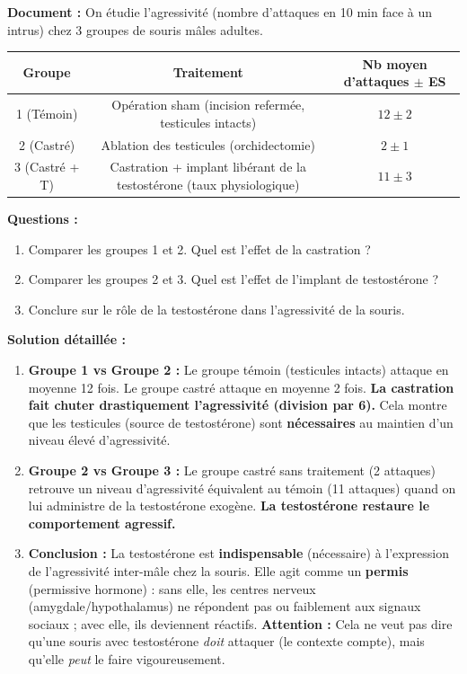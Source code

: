 \documentclass[11pt]{article}
\begin{document}
\begin{exoresolu}
\textbf{Document :} On étudie l'agressivité (nombre d'attaques en 10 min face à un intrus) chez 3 groupes de souris mâles adultes.
\begin{center}
\begin{tabular}{|c|c|c|}
\hline
\textbf{Groupe} & \textbf{Traitement} & \textbf{Nb moyen d'attaques $\pm$ ES} \\
\hline
1 (Témoin) & Opération sham (incision refermée, testicules intacts) & $12 \pm 2$ \\
\hline
2 (Castré) & Ablation des testicules (orchidectomie) & $2 \pm 1$ \\
\hline
3 (Castré + T) & Castration + implant libérant de la testostérone (taux physiologique) & $11 \pm 3$ \\
\hline
\end{tabular}
\end{center}

\textbf{Questions :}
\begin{enumerate}
    \item Comparer les groupes 1 et 2. Quel est l'effet de la castration ?
    \item Comparer les groupes 2 et 3. Quel est l'effet de l'implant de testostérone ?
    \item Conclure sur le rôle de la testostérone dans l'agressivité de la souris.
\end{enumerate}

\tcblower

\textbf{Solution détaillée :}
\begin{enumerate}
    \item \textbf{Groupe 1 vs Groupe 2 :} Le groupe témoin (testicules intacts) attaque en moyenne 12 fois. Le groupe castré attaque en moyenne 2 fois. \textbf{La castration fait chuter drastiquement l'agressivité (division par 6).} Cela montre que les testicules (source de testostérone) sont \textbf{nécessaires} au maintien d'un niveau élevé d'agressivité.
    \item \textbf{Groupe 2 vs Groupe 3 :} Le groupe castré sans traitement (2 attaques) retrouve un niveau d'agressivité équivalent au témoin (11 attaques) quand on lui administre de la testostérone exogène. \textbf{La testostérone restaure le comportement agressif.}
    \item \textbf{Conclusion :} La testostérone est \textbf{indispensable} (nécessaire) à l'expression de l'agressivité inter-mâle chez la souris. Elle agit comme un \textbf{permis} (permissive hormone) : sans elle, les centres nerveux (amygdale/hypothalamus) ne répondent pas ou faiblement aux signaux sociaux ; avec elle, ils deviennent réactifs. \textbf{Attention :} Cela ne veut pas dire qu'une souris avec testostérone \emph{doit} attaquer (le contexte compte), mais qu'elle \emph{peut} le faire vigoureusement.
\end{enumerate}
\end{exoresolu}
\end{document}
